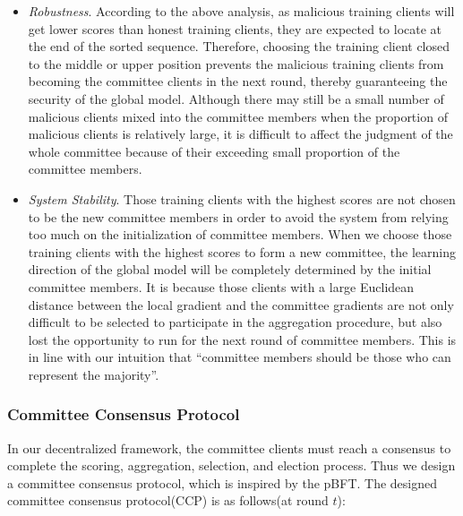 \documentclass[10pt,journal,compsoc]{IEEEtran}
\begin{document}
\begin{itemize}
  \item \textit{Robustness}. According to the above analysis, as malicious training clients will get lower scores than honest training clients, they are expected to locate at the end of the sorted sequence. Therefore, choosing the training client closed to the middle or upper position prevents the malicious training clients from becoming the committee clients in the next round, thereby guaranteeing the security of the global model. Although there may still be a small number of malicious clients mixed into the committee members when the proportion of malicious clients is relatively large, it is difficult to affect the judgment of the whole committee because of their exceeding small proportion of the committee members.
  \item \textit{System Stability}. Those training clients with the highest scores are not chosen to be the new committee members in order to avoid the system from relying too much on the initialization of committee members. When we choose those training clients with the highest scores to form a new committee, the learning direction of the global model will be completely determined by the initial committee members. It is because those clients with a large Euclidean distance between the local gradient and the committee gradients are not only difficult to be selected to participate in the aggregation procedure, but also lost the opportunity to run for the next round of committee members. This is in line with our intuition that “committee members should be those who can represent the majority”.
\end{itemize}


\subsubsection{Committee Consensus Protocol}
\label{CommitteeConsensus}

In our decentralized framework, the committee clients must reach a consensus to complete the scoring, aggregation, selection, and election process. Thus we design a committee consensus protocol, which is inspired by the pBFT\cite{8069090}. The designed committee consensus protocol(CCP) is as follows(at round $t$):
\end{document}
